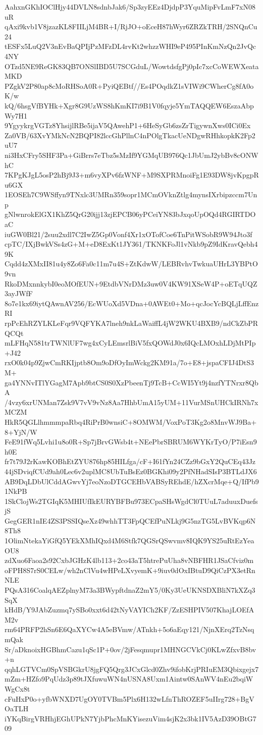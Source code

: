 AahxnGKhIOClHjy44DVLN8sdnbJak6/Sp3zyEEz4DjdpP3YquMipFvLmF7xN08uR
qAxi9kvb1V8jzazKL8FIILjM4BR+I/RjJO+oEceH87hWyr6ZRZkTRH/2SNQnCu24
tESFx5LuQ2V3nEvBaQPIjPzMFzDL4rvKt2whzzWHI9eP495PInKmNzQn2JvQc4NY
OTzd5NE9ReGK83QB7ONSlIBD5U7SCGduL/WowtdsfgPj0pIc7xcCoWEWXeataMKD
PZgkV2P80ap8cMoRHSoA0R+PyiQEBtf//Es4POqdkZ1sVIWi9CWherCg8fA0oK/w
kQ/6hsgVfBYHk+Xgr8G9UzWS8hKmKI7i9B1V0fqyje5YmTAQQEW6EszaAbpWy7H1
9YgyykrgVGTz8YhsijlRBe5ijaV5QAwehP1+6HeSyGb6zsZrTigywnXws0ICi0Ex
Za0VB/63XvYMkNcN2BQPI82lccGhPllnC4nPOlgTkacUeNDgwRHhkopkK2Fp2uU7
ni3HxCFry5SHF3Pa+GiBrrs7eTbz5sMzIf9YGMqUB976Qc1JbUmJ2ybBv8cONWhC
7KPgKJgL5osP2hBj9J3+m6vyXPv6fzWNF+M9SXPRMnoiFg1E93DW8jvKpgpRu6GX
1EOSEh7C9WSffyn9TNxlc3UMRn359sopr1MCmOVknZtlg4mynsIXrbipzccm7Unp
gNlwnrokElGX1KhZ5QrG20ijj13zjEPCB06yPCeiYN83bJxqoUpOQd4RGIRTDOaC
iuGW0Bl21/2suu2xdl7C2IwZ5Gp0Vonf4Xr1xOTofCoe6TnPitWSobR9W94Jto3f
cpTC/IXjBwkVSs4zG+M+eD8ExKt1JY361/TKNKFoJl1vNkb9pZ9IdKravQebh49K
Cqdd4zXMxII81u4y8Zo6Fa0c11m7u4S+ZtKdwW/LEBRvhvTwkuaUHrL3YBPtO9vn
RkoDMxnnkybI0eoMOfEUN+9EtdbVNrDMz3uw0V4KW91XSeW4P+oETqUQZ3ayJWfF
8o7e1kx69iytQAwnAV256/EcWUoXd5VDna+0AWEt0+Mo+qcJocYcBQLjLffEnzRI
rpPcEhRZYLKLeFqr9VQFYKA7lneh9nkLaWaiffL4jW2WKU4BXB9/ndCkZbPRQCQt
mLFHqN581trTWNlUF7wg4xCyLEmsrlBiV5fxQOWdJ0x6IQcLMOxhLDjMtPIp+J42
rxO0k04p9ZjwCmRKIjptb8Om9oDfOyImWckg2KM91a/7o+E8+jspaCFIJ4DtS3M+
ga4YNNvITlYGagM7Apb9btCS0S0XzPbeenTj9TcB+CcWI5Yt9j4nzfYTNrxr8QbA
/4vzy6xrUNMan7Zsk9V7vV9vNz8Aa7HhbUmA15yUM+11VurMSnUHCkIRNh7xMCZM
HkR5QGLlhmmmpaRbq4RiPrB0wnsiC+8OMWM/VoxPoT3Kg2o8MnvWJ9Ba+8+YjN/W
FeE91fWq5Lvhi1u8o0R+Sp7jBrvGWsb4t+NEePbrSBRUM6WYKrTyO/P7iEsn9h0E
fr7t79J2rKawKOBhEtZYU876hp85HILfga/cF+I61fYn24CZz9bGxY2QuCEq43Jz
44jSDviqfCUd9ah0Lec6v2uplMC8UbTuBsEz0BGKhi09y2PfNHadSIsP3BTLdJX6
AB9DqLDbUlCddAGwvYj7eoNzoDTGCEHbVABSyREhdE/hZXcrMqe+Q/IfPb91NkPB
1SkClojWs2TGIqK5MHIUfIkEURYBFBu973ECpaSHsWgdCl0TUuL7aduuxDuefsjS
GegGER1nIE4ZS3PSSIQseXz49whhTT3FpQCEfPuNLkj9G5nzTG5LvBVKqp6N8Th8
1OlimNtekaYiGfQ5YEkXMhIQxd4M6Stfk7QGSrQSwvmv8IQK9YS25uRtEzYeaOU8
zdXuo6Faoa2s92CxbJGHzK4lb113+2co43aT5htrePuUha8vNBFHR1JSaCfviz0m
oFPH8S7rS0CELw/wh2nClVu4wHPeLXvyemK+9iuv0dOxIBtuD9QiCzPX3etRnNLE
PQsA316CoalqAEZplnyM73a3BWypftdnaZ2mY5/0Ky3UeUKNSDXBliN7kXZq3SqX
kHdB/Y9JAbZuzmq7ySBo0xxt6d42tNyVAYICh2KF/ZzESHPIV507KhajLOEfAM2v
rm64PRFP2hSn6E6QaXYCw4A5eBVmw/ATnkh+5o6aEqy121/NjnXErq2TzNsqmQak
Sr/aDknoixHGBhmCazu1qSc1P+0ov/2jFesqmupr1MHNGCVkCj0KLwZfxvB8bv+n
qqhLGTVCm0SpVSBGkrU8jgFQ5Qrg3JCxGlcd0Zhv9ifobKrjPRIuEM3Qbixgejx7
mZm+HZfo9PqUdz3p89tJXfuwuWN4nUSNA8Uxm1Aintw0SAnWV4nEu2bqiWWgCx8t
cFuHxP0o+yfbWNXD7UgOY0TVBm5Plx6H132wLfnThROZEF5uIIrg728+BgVOaTLH
iYKqBirgVRHhjEGhUPkN7YjbPhcMnKYisezuVim4sjK2x3bk1IV5AzD39OBtG709
